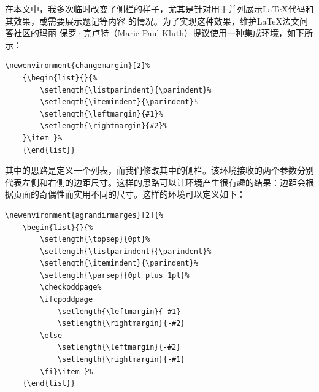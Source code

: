 在本文中，我多次临时改变了侧栏的样子，尤其是针对用于并列展示\LaTeX 代码和其效果，或需要展示题记等内容%
的情况。为了实现这种效果，维护\LaTeX 法文问答社区的玛丽-保罗·克卢特（Marie-Paul Kluth）提议使用一种集成环境，如下所示：

\begin{dmd}
\begin{verbatim}
\newenvironment{changemargin}[2]% 
    {\begin{list}{}{%
        \setlength{\listparindent}{\parindent}% 
        \setlength{\itemindent}{\parindent}% 
        \setlength{\leftmargin}{#1}% 
        \setlength{\rightmargin}{#2}%
    }\item }% 
    {\end{list}}
\end{verbatim}
\end{dmd}

其中的思路是定义一个列表，而我们修改其中的侧栏。该环境接收的两个参数分别代表左侧和右侧的边距尺寸。这样的思路可以让环境产生很有趣的结果：边距会根据页面的奇偶性而实用不同的尺寸。这样的环境可以定义如下：

\begin{dmd}
\begin{verbatim}
\newenvironment{agrandirmarges}[2]{% 
    \begin{list}{}{%
        \setlength{\topsep}{0pt}% 
        \setlength{\listparindent}{\parindent}% 
        \setlength{\itemindent}{\parindent}% 
        \setlength{\parsep}{0pt plus 1pt}% 
        \checkoddpage%
        \ifcpoddpage
            \setlength{\leftmargin}{-#1}
            \setlength{\rightmargin}{-#2}
        \else
            \setlength{\leftmargin}{-#2}
            \setlength{\rightmargin}{-#1}
        \fi}\item }% 
    {\end{list}}
\end{verbatim}
\end{dmd}

\newenvironment{agrandirmarges}[2]{%
    \begin{list}{}{%
        \setlength{\topsep}{0pt}%
        \setlength{\listparindent}{\parindent}%
        \setlength{\itemindent}{\parindent}%
        \setlength{\parsep}{0pt plus 1pt}%
        \checkoddpage%
        \ifcpoddpage
            \setlength{\leftmargin}{-#1}
            \setlength{\rightmargin}{-#2}
        \else
            \setlength{\leftmargin}{-#2}
            \setlength{\rightmargin}{-#1}
        \fi}\item }%
    {\end{list}}

